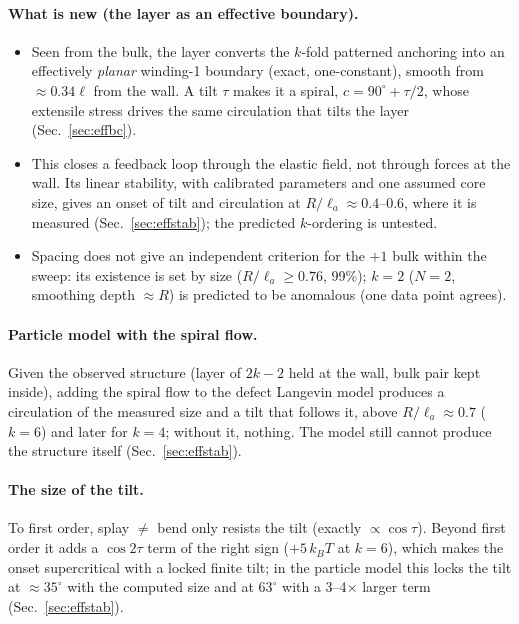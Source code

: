 \paragraph{What is new (the layer as an effective boundary).}
\begin{itemize}
  \item Seen from the bulk, the layer converts the $k$-fold patterned anchoring into an effectively \emph{planar} winding-1 boundary (exact, one-constant), smooth
        from $\approx0.34\ell$ from the wall. A tilt $\tau$ makes it a spiral, $c=90^\circ+\tau/2$, whose extensile stress drives the same circulation that tilts the
        layer (Sec.~\ref{sec:effbc}).
  \item This closes a feedback loop through the elastic field, not through forces at the wall. Its linear stability, with calibrated parameters and one assumed
        core size, gives an onset of tilt and circulation at $R/\ell_a\approx0.4$--0.6, where it is measured (Sec.~\ref{sec:effstab}); the predicted $k$-ordering is
        untested.
  \item Spacing does not give an independent criterion for the $+1$ bulk within the sweep: its existence is set by size ($R/\ell_a\ge0.76$, 99\%); $k=2$
        ($N=2$, smoothing depth $\approx R$) is predicted to be anomalous (one data point agrees).
\end{itemize}

\paragraph{Particle model with the spiral flow.} Given the observed structure (layer of $2k-2$ held at the wall, bulk pair kept inside), adding the
spiral flow to the defect Langevin model produces a circulation of the measured size and a tilt that follows it, above $R/\ell_a\approx0.7$ ($k=6$) and
later for $k=4$; without it, nothing. The model still cannot produce the structure itself (Sec.~\ref{sec:effstab}).

\paragraph{The size of the tilt.} To first order, splay $\neq$ bend only resists the tilt (exactly $\propto\cos\tau$). Beyond first order it adds a
$\cos2\tau$ term of the right sign ($+5\,k_BT$ at $k=6$), which makes the onset supercritical with a locked finite tilt; in the particle model this
locks the tilt at $\approx35^\circ$ with the computed size and at $63^\circ$ with a 3--4$\times$ larger term (Sec.~\ref{sec:effstab}).

